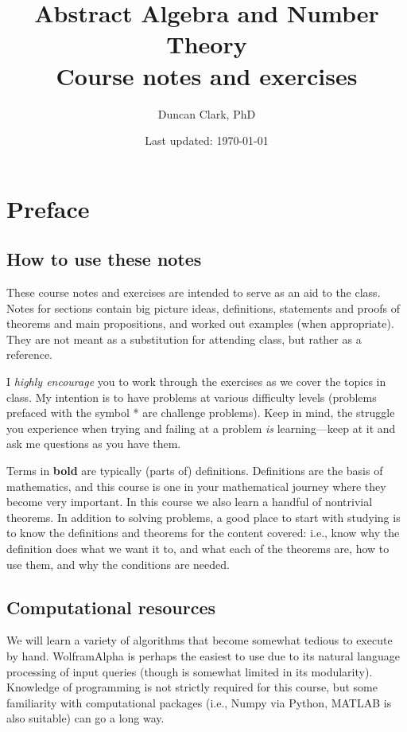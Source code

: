 \documentclass[12pt]{article}
\numberwithin{equation}{subsection}
\theoremstyle{note}
\begin{document}
%


\title{ \textbf{Abstract Algebra and Number Theory \\ Course notes and exercises
 }}
\author{\small Duncan Clark, PhD}
\date{\small Last updated: \today}

\setcounter{section}{-1}
\maketitle
\tableofcontents

\section{Preface}


\subsection{How to use these notes} These course notes and exercises are intended to serve as an aid to the class. Notes for sections contain big picture ideas, definitions, statements and proofs of theorems and main propositions, and worked out examples (when appropriate). They are not meant as a substitution for attending class, but rather as a reference. 

I \textit{highly encourage} you to work through the exercises as we cover the topics in class. My intention is to have problems at various difficulty levels (problems prefaced with the symbol * are challenge problems). Keep in mind, the struggle you experience when trying and failing at a problem \textit{is} learning---keep at it and ask me questions as you have them. 


Terms in \textbf{bold} are typically (parts of) definitions. Definitions are the basis of mathematics, and this course is one in your mathematical journey where they become very important. In this course we also learn a handful of nontrivial theorems. In addition to solving problems, a good place to start with studying is to know the definitions and theorems for the content covered: i.e., know why the definition does what we want it to, and  what each of the theorems are, how to use them, and why the conditions are needed.

\subsection{Computational resources}
We will learn a variety of algorithms that become somewhat tedious to execute by hand.  WolframAlpha is perhaps the easiest to use due to its natural language processing of input queries (though is somewhat limited in its modularity). Knowledge of programming is not strictly required for this course, but some familiarity with computational packages (i.e., Numpy via Python, MATLAB is also suitable) can go a long way.
\end{document}
